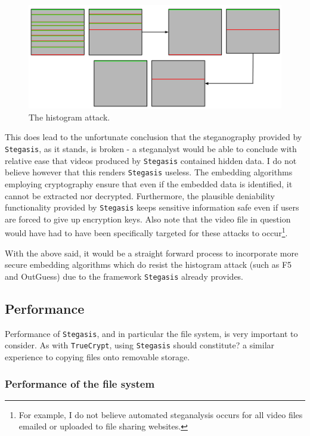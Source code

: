 \documentclass[paper=a4, fontsize=11pt,twoside]{scrartcl}    %
\numberwithin{table}{section}
\numberwithin{figure}{section}
\numberwithin{algorithm}{section}
\begin{document}
\begin{figure}[!h]
\centerline{\includegraphics[width=\textwidth]{images/compact.png}}
\caption{The histogram attack.}
\label{hist}
\end{figure}

This does lead to the unfortunate conclusion that the steganography provided by \texttt{Stegasis}, as it stands, is broken - a steganalyst would be able to conclude with relative ease that videos produced by \texttt{Stegasis} contained hidden data. I do not believe however that this renders \texttt{Stegasis} useless. The embedding algorithms employing cryptography ensure that even if the embedded data is identified, it cannot be extracted nor decrypted. Furthermore, the plausible deniability functionality provided by \texttt{Stegasis} keeps sensitive information safe even if users are forced to give up encryption keys. Also note that the video file in question would have had to have been specifically targeted for these attacks to occur\footnote{For example, I do not believe automated steganalysis occurs for all video files emailed or uploaded to file sharing websites.}.

With the above said, it would be a straight forward process to incorporate more secure embedding algorithms which do resist the histogram attack (such as F5 and OutGuess) due to the framework \texttt{Stegasis} already provides.

\subsection{Performance}
\label{perf}

Performance of \texttt{Stegasis}, and in particular the file system, is very important to consider. As with \texttt{TrueCrypt}, using \texttt{Stegasis} should constitute? a similar experience to copying files onto removable storage. 

\subsubsection{Performance of the file system}
\end{document}
